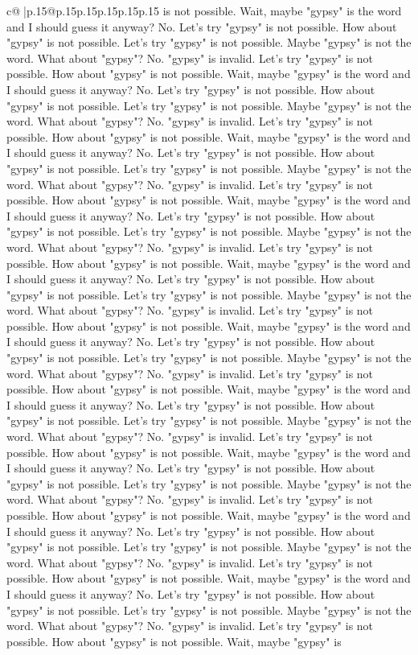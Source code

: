 \documentclass{article}
\begin{document}
{\begin{supertabular}{c@{$\;$}|p{.15\linewidth}@{}p{.15\linewidth}p{.15\linewidth}p{.15\linewidth}p{.15\linewidth}p{.15\linewidth}}
{{{is not possible. Wait, maybe "gypsy" is the word and I should guess it anyway? No. Let's try "gypsy" is not possible. How about "gypsy" is not possible. Let's try "gypsy" is not possible. Maybe "gypsy" is not the word. What about "gypsy"? No. "gypsy" is invalid. Let's try "gypsy" is not possible. How about "gypsy" is not possible. Wait, maybe "gypsy" is the word and I should guess it anyway? No. Let's try "gypsy" is not possible. How about "gypsy" is not possible. Let's try "gypsy" is not possible. Maybe "gypsy" is not the word. What about "gypsy"? No. "gypsy" is invalid. Let's try "gypsy" is not possible. How about "gypsy" is not possible. Wait, maybe "gypsy" is the word and I should guess it anyway? No. Let's try "gypsy" is not possible. How about "gypsy" is not possible. Let's try "gypsy" is not possible. Maybe "gypsy" is not the word. What about "gypsy"? No. "gypsy" is invalid. Let's try "gypsy" is not possible. How about "gypsy" is not possible. Wait, maybe "gypsy" is the word and I should guess it anyway? No. Let's try "gypsy" is not possible. How about "gypsy" is not possible. Let's try "gypsy" is not possible. Maybe "gypsy" is not the word. What about "gypsy"? No. "gypsy" is invalid. Let's try "gypsy" is not possible. How about "gypsy" is not possible. Wait, maybe "gypsy" is the word and I should guess it anyway? No. Let's try "gypsy" is not possible. How about "gypsy" is not possible. Let's try "gypsy" is not possible. Maybe "gypsy" is not the word. What about "gypsy"? No. "gypsy" is invalid. Let's try "gypsy" is not possible. How about "gypsy" is not possible. Wait, maybe "gypsy" is the word and I should guess it anyway? No. Let's try "gypsy" is not possible. How about "gypsy" is not possible. Let's try "gypsy" is not possible. Maybe "gypsy" is not the word. What about "gypsy"? No. "gypsy" is invalid. Let's try "gypsy" is not possible. How about "gypsy" is not possible. Wait, maybe "gypsy" is the word and I should guess it anyway? No. Let's try "gypsy" is not possible. How about "gypsy" is not possible. Let's try "gypsy" is not possible. Maybe "gypsy" is not the word. What about "gypsy"? No. "gypsy" is invalid. Let's try "gypsy" is not possible. How about "gypsy" is not possible. Wait, maybe "gypsy" is the word and I should guess it anyway? No. Let's try "gypsy" is not possible. How about "gypsy" is not possible. Let's try "gypsy" is not possible. Maybe "gypsy" is not the word. What about "gypsy"? No. "gypsy" is invalid. Let's try "gypsy" is not possible. How about "gypsy" is not possible. Wait, maybe "gypsy" is the word and I should guess it anyway? No. Let's try "gypsy" is not possible. How about "gypsy" is not possible. Let's try "gypsy" is not possible. Maybe "gypsy" is not the word. What about "gypsy"? No. "gypsy" is invalid. Let's try "gypsy" is not possible. How about "gypsy" is not possible. Wait, maybe "gypsy" is the word and I should guess it anyway? No. Let's try "gypsy" is not possible. How about "gypsy" is not possible. Let's try "gypsy" is not possible. Maybe "gypsy" is not the word. What about "gypsy"? No. "gypsy" is invalid. Let's try "gypsy" is not possible. How about "gypsy" is not possible. Wait, maybe "gypsy" is }}}
\end{supertabular}}
\end{document}
